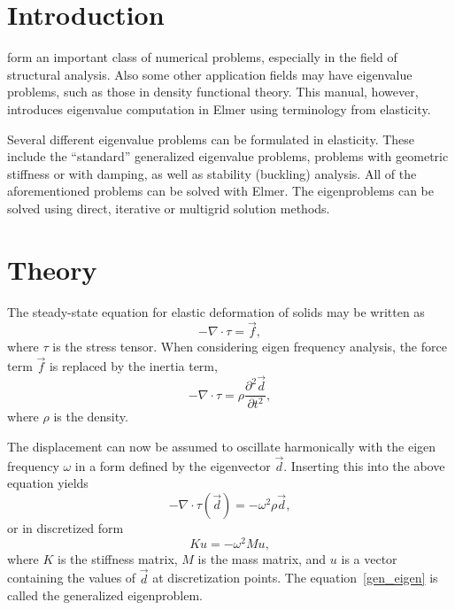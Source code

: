 \noindent

\begin{versiona}

\section{Introduction}

 form an important class of numerical problems,
especially in the field of structural analysis. Also some other
application fields may have eigenvalue problems, such as those in
density functional theory. This manual, however, introduces eigenvalue
computation in Elmer using terminology from elasticity.

Several different eigenvalue problems can be formulated in
elasticity. These include the ``standard'' generalized eigenvalue
problems, problems with geometric stiffness or with damping, as well
as stability (buckling) analysis. All of the aforementioned problems
can be solved with Elmer. The eigenproblems can be solved using
direct, iterative or multigrid solution methods.


\section{Theory}

The steady-state equation for elastic deformation of solids may be
written as
\begin{equation}
-\nabla\cdot\tau = \vec{f},
\end{equation}
where $\tau$ is the stress tensor. When considering eigen frequency
analysis, the force term $\vec{f}$ is replaced by the inertia term,
\begin{equation}
-\nabla\cdot\tau = \rho\frac{\partial^2 \vec{d}}{\partial t^2},
\end{equation}
where $\rho$ is the density.

The displacement can now be assumed to oscillate harmonically with the
eigen frequency $\omega$ in a form defined by the eigenvector
$\vec{d}$. Inserting this into the above equation yields
\begin{equation}
-\nabla\cdot\tau(\vec{d}) = 
-\omega^2\rho\vec{d},
\end{equation}
or in discretized form
\begin{equation}
\label{gen_eigen}
Ku = -\omega^2Mu,
\end{equation}
where $K$ is the stiffness matrix, $M$ is the mass matrix, and $u$ is
a vector containing the values of $\vec{d}$ at discretization
points. The equation~\ref{gen_eigen} is called the generalized
eigenproblem.


\end{versiona}
